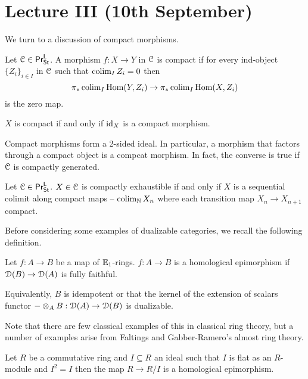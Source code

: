\section{Lecture III (10th September)}\label{sec: Matthew III}
We turn to a discussion of compact morphisms. 
\begin{definition}\label{def: compact morphism}
    Let $\EuScript{C}\in\mathsf{Pr}^{\mathsf{L}}_{\mathsf{St}}$. A morphism $f:X\to Y$ in $\EuScript{C}$ is compact if for every ind-object $\{Z_{i}\}_{i\in I}$ in $\EuScript{C}$ such that $\operatorname{colim}_{I}Z_{i}=0$ then 
    $$\pi_{*}\operatorname{colim}_{I}\mathrm{Hom}(Y,Z_{i})\to\pi_{*}\operatorname{colim}_{I}\mathrm{Hom}(X,Z_{i})$$
    is the zero map. 
\end{definition}
\begin{remark}
    $X$ is compact if and only if $\mathrm{id}_{X}$ is a compact morphism. 
\end{remark}
\begin{remark}
    Compact morphisms form a 2-sided ideal. In particular, a morphism that factors through a compact object is a compcat morphism. In fact, the converse is true if $\EuScript{C}$ is compactly generated. 
\end{remark}
\begin{definition}\label{def: compactly exhaustible}
    Let $\EuScript{C}\in\mathsf{Pr}^{\mathsf{L}}_{\mathsf{St}}$. $X\in\EuScript{C}$ is compactly exhaustible if and only if $X$ is a sequential colimit along compact maps -- $\operatorname{colim}_{\mathbb{N}}X_{n}$ where each transition map $X_{n}\to X_{n+1}$ compact. 
\end{definition}
Before considering some examples of dualizable categories, we recall the following definition. 
\begin{definition}\label{def: homological epimorphism}
    Let $f:A\to B$ be a map of $\mathbb{E}_{1}$-rings. $f:A\to B$ is a homological epimorphism if $\EuScript{D}(B)\to\EuScript{D}(A)$ is fully faithful. 
\end{definition}
\begin{remark}
    Equivalently, $B$ is idempotent or that the kernel of the extension of scalars functor $-\otimes_{A}B:\EuScript{D}(A)\to\EuScript{D}(B)$ is dualizable. 
\end{remark}
Note that there are few classical examples of this in classical ring theory, but a number of examples arise from Faltings and Gabber-Ramero's almost ring theory. 
\begin{example}
    Let $R$ be a commutative ring and $I\subseteq R$ an ideal such that $I$ is flat as an $R$-module and $I^{2}=I$ then the map $R\to R/I$ is a homological epimorphism. 
\end{example}
